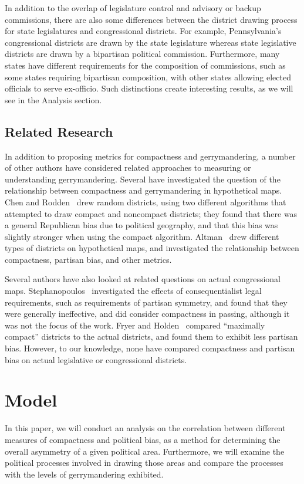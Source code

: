 \documentclass[12pt]{article}
\begin{document}
In addition to the overlap of legislature control and advisory or backup commissions, there are also some differences between the district drawing process for state legislatures and congressional districts.  For example, Pennsylvania's congressional districts are drawn by the state legislature whereas state legislative districts are drawn by a bipartisan political commission.  Furthermore, many states have different requirements for the composition of commissions, such as some states requiring bipartisan composition, with other states allowing elected officials to serve ex-officio.  Such distinctions create interesting results, as we will see in the Analysis section.

\subsection{Related Research}

In addition to proposing metrics for compactness and gerrymandering, a number of other authors have considered related approaches to measuring or understanding gerrymandering.  Several have investigated the question of the relationship between compactness and gerrymandering in hypothetical maps.  Chen and Rodden~\cite{chenrodden} drew random districts, using two different algorithms that attempted to draw compact and noncompact districts; they found that there was a general Republican bias due to political geography, and that this bias was slightly stronger when using the compact algorithm.  Altman~\cite{altman} drew different types of districts on hypothetical maps, and investigated the relationship between compactness, partisan bias, and other metrics.

Several authors have also looked at related questions on actual congressional maps.  Stephanopoulos~\cite{stephanopoulos2} investigated the effects of consequentialist legal requirements, such as requirements of partisan symmetry, and found that they were generally ineffective, and did consider compactness in passing, although it was not the focus of the work.  Fryer and Holden~\cite{fryer} compared ``maximally compact'' districts to the actual districts, and found them to exhibit less partisan bias.  However, to our knowledge, none have compared compactness and partisan bias on actual legislative or congressional districts.

  \section{Model}\label{s:model}
  In this paper, we will conduct an analysis on the correlation between different measures of compactness and political bias, as a method for determining the overall asymmetry of a given political area.  Furthermore, we will examine the political processes involved in drawing those areas and compare the processes with the levels of gerrymandering exhibited.
\end{document}
